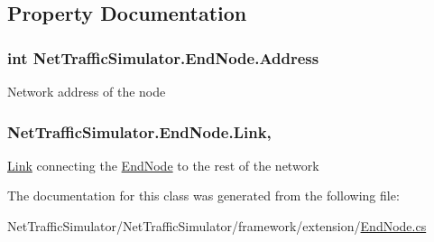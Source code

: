 \subsection{Property Documentation}
\hypertarget{classNetTrafficSimulator_1_1EndNode_ad810757c44c8e17c2147a2ae1598a840}{
\subsubsection[{Address}]{\setlength{\rightskip}{0pt plus 5cm}int Net\-Traffic\-Simulator.\-End\-Node.\-Address\hspace{0.3cm}{\ttfamily [get]}}}\label{classNetTrafficSimulator_1_1EndNode_ad810757c44c8e17c2147a2ae1598a840}
Network address of the node \hypertarget{classNetTrafficSimulator_1_1EndNode_aaa7c476166fa515ebc9d16c6ccc83875}{
\subsubsection[{Link}]{ Net\-Traffic\-Simulator.\-End\-Node.\-Link\hspace{0.3cm}{\ttfamily [get]}, {\ttfamily [set]}}}\label{classNetTrafficSimulator_1_1EndNode_aaa7c476166fa515ebc9d16c6ccc83875}
\hyperlink{classNetTrafficSimulator_1_1Link}{Link} connecting the \hyperlink{classNetTrafficSimulator_1_1EndNode}{End\-Node} to the rest of the network 

The documentation for this class was generated from the following file\-:\begin{DoxyCompactItemize}
\item 
Net\-Traffic\-Simulator/\-Net\-Traffic\-Simulator/framework/extension/\hyperlink{EndNode_8cs}{End\-Node.\-cs}\end{DoxyCompactItemize}
